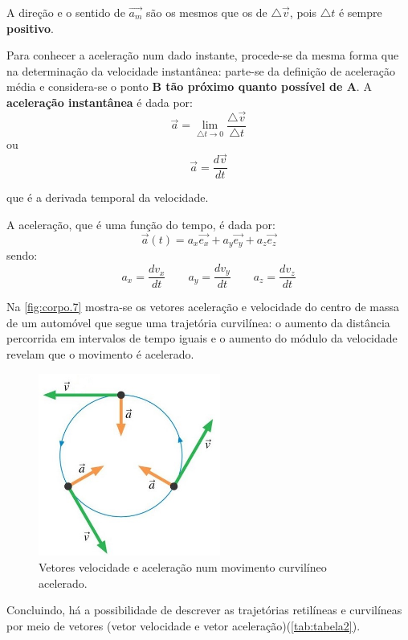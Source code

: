 \documentclass[a4paper,11pt,oneside]{report}
\begin{document}
A direção e o sentido de $\overrightarrow{a_m}$ são os mesmos que os de $\bigtriangleup\overrightarrow{v} $, pois $\bigtriangleup t$ é sempre \textbf{positivo}.

Para conhecer a aceleração num dado instante, procede-se da mesma forma que na determinação da velocidade instantânea: 
parte-se da definição de aceleração média e considera-se o ponto \textbf{B tão próximo quanto possível de A}. A \textbf{aceleração instantânea} 
é dada por:
\[
    \overrightarrow{a}=\lim_{\bigtriangleup t\to 0} \frac{\bigtriangleup\overrightarrow{v}}{\bigtriangleup t}    
\]
ou 
\[
    \overrightarrow{a}=\frac{d \overrightarrow{v}}{d t}  
\]

que é a derivada temporal da velocidade. 

A aceleração, que é uma função do tempo, é dada por:
\[
    \overrightarrow{a}(t)=a_x\overrightarrow{e_x}+a_y\overrightarrow{e_y}+a_z\overrightarrow{e_z}    
\]
sendo:
\[
    a_x=\frac{d v_x}{d t} \qquad a_y=\frac{d v_y}{d t} \qquad a_z=\frac{d v_z}{d t}  
\]

Na \autoref{fig:corpo.7} mostra-se os vetores aceleração e velocidade do centro de massa de um automóvel que segue uma trajetória curvilínea: 
o aumento da distância percorrida em intervalos de tempo iguais e o aumento do módulo da velocidade revelam que o movimento 
é acelerado.

\begin{figure}[H]
    \center
    \includegraphics[height=170pt]{figuras/Fig 3.2.jpg}
    \caption{Vetores velocidade e aceleração num movimento curvilíneo acelerado.}
    \label{fig:corpo.7}
\end{figure}

Concluindo, há a possibilidade de descrever as trajetórias retilíneas e curvilíneas por meio de vetores (vetor velocidade 
e vetor aceleração)(\autoref{tab:tabela2}). 
\end{document}

